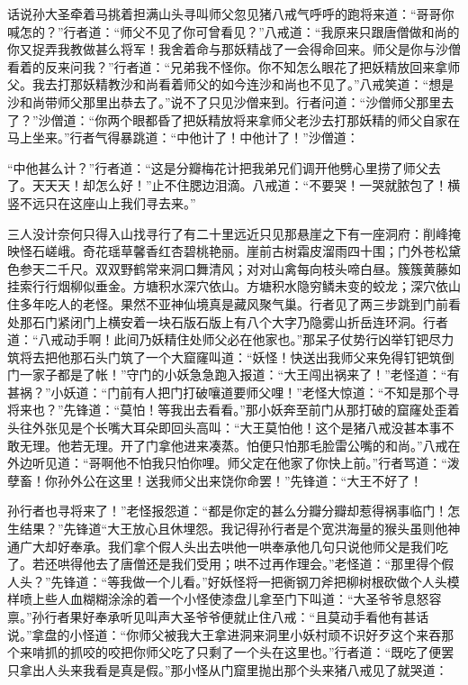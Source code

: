 \documentclass[12pt,UTF8]{ctexbook}
\begin{document}
{	话说孙大圣牵着马挑着担满山头寻叫师父忽见猪八戒气呼呼的跑将来道：“哥哥你喊怎的？”行者道：“师父不见了你可曾看见？”八戒道：“我原来只跟唐僧做和尚的你又捉弄我教做甚么将军！我舍着命与那妖精战了一会得命回来。师父是你与沙僧看着的反来问我？”行者道：“兄弟我不怪你。你不知怎么眼花了把妖精放回来拿师父。我去打那妖精教沙和尚看着师父的如今连沙和尚也不见了。”八戒笑道：“想是沙和尚带师父那里出恭去了。”说不了只见沙僧来到。行者问道：“沙僧师父那里去了？”沙僧道：“你两个眼都昏了把妖精放将来拿师父老沙去打那妖精的师父自家在马上坐来。”行者气得暴跳道：“中他计了！中他计了！”沙僧道：
	
	“中他甚么计？”行者道：“这是分瓣梅花计把我弟兄们调开他劈心里捞了师父去了。天天天！却怎么好！”止不住腮边泪滴。八戒道：“不要哭！一哭就脓包了！横竖不远只在这座山上我们寻去来。”
	
	三人没计奈何只得入山找寻行了有二十里远近只见那悬崖之下有一座洞府：削峰掩映怪石嵯峨。奇花瑶草馨香红杏碧桃艳丽。崖前古树霜皮溜雨四十围；门外苍松黛色参天二千尺。双双野鹤常来洞口舞清风；对对山禽每向枝头啼白昼。簇簇黄藤如挂索行行烟柳似垂金。方塘积水深穴依山。方塘积水隐穷鳞未变的蛟龙；深穴依山住多年吃人的老怪。果然不亚神仙境真是藏风聚气巢。行者见了两三步跳到门前看处那石门紧闭门上横安着一块石版石版上有八个大字乃隐雾山折岳连环洞。行者道：“八戒动手啊！此间乃妖精住处师父必在他家也。”那呆子仗势行凶举钉钯尽力筑将去把他那石头门筑了一个大窟窿叫道：“妖怪！快送出我师父来免得钉钯筑倒门一家子都是了帐！”守门的小妖急急跑入报道：“大王闯出祸来了！”老怪道：“有甚祸？”小妖道：“门前有人把门打破嚷道要师父哩！”老怪大惊道：“不知是那个寻将来也？”先锋道：“莫怕！等我出去看看。”那小妖奔至前门从那打破的窟窿处歪着头往外张见是个长嘴大耳朵即回头高叫：“大王莫怕他！这个是猪八戒没甚本事不敢无理。他若无理。开了门拿他进来凑蒸。怕便只怕那毛脸雷公嘴的和尚。”八戒在外边听见道：“哥啊他不怕我只怕你哩。师父定在他家了你快上前。”行者骂道：“泼孽畜！你孙外公在这里！送我师父出来饶你命罢！”先锋道：“大王不好了！
	
	孙行者也寻将来了！”老怪报怨道：“都是你定的甚么分瓣分瓣却惹得祸事临门！怎生结果？”先锋道“大王放心且休埋怨。我记得孙行者是个宽洪海量的猴头虽则他神通广大却好奉承。我们拿个假人头出去哄他一哄奉承他几句只说他师父是我们吃了。若还哄得他去了唐僧还是我们受用；哄不过再作理会。”老怪道：“那里得个假人头？”先锋道：“等我做一个儿看。”好妖怪将一把衠钢刀斧把柳树根砍做个人头模样喷上些人血糊糊涂涂的着一个小怪使漆盘儿拿至门下叫道：“大圣爷爷息怒容禀。”孙行者果好奉承听见叫声大圣爷爷便就止住八戒：“且莫动手看他有甚话说。”拿盘的小怪道：“你师父被我大王拿进洞来洞里小妖村顽不识好歹这个来吞那个来啃抓的抓咬的咬把你师父吃了只剩了一个头在这里也。”行者道：“既吃了便罢只拿出人头来我看是真是假。”那小怪从门窟里抛出那个头来猪八戒见了就哭道：
	
}
\end{document}
